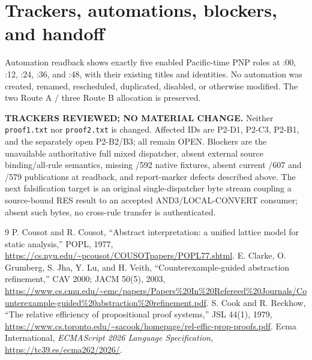 \documentclass[11pt]{article}
\begin{document}
\section{Trackers, automations, blockers, and handoff}
Automation readback shows exactly five enabled Pacific-time PNP roles at :00, :12, :24, :36, and :48, with their existing titles and identities.  No automation was created, renamed, rescheduled, duplicated, disabled, or otherwise modified.  The two Route A / three Route B allocation is preserved.

\textbf{TRACKERS REVIEWED; NO MATERIAL CHANGE.}  Neither \texttt{proof1.txt} nor \texttt{proof2.txt} is changed.  Affected IDs are P2-D1, P2-C3, P2-B1, and the separately open P2-B2/B3; all remain OPEN.  Blockers are the unavailable authoritative full mixed dispatcher, absent external source binding/all-rule semantics, missing /592 native fixtures, absent current /607 and /579 publications at readback, and report-marker defects described above.  The next falsification target is an original single-dispatcher byte stream coupling a source-bound RES result to an accepted AND3/LOCAL-CONVERT consumer; absent such bytes, no cross-rule transfer is authenticated.

\begin{thebibliography}{9}
 P. Cousot and R. Cousot, ``Abstract interpretation: a unified lattice model for static analysis,'' POPL, 1977, \url{https://cs.nyu.edu/~pcousot/COUSOTpapers/POPL77.shtml}.
 E. Clarke, O. Grumberg, S. Jha, Y. Lu, and H. Veith, ``Counterexample-guided abstraction refinement,'' CAV 2000; JACM 50(5), 2003, \url{https://www.cs.cmu.edu/~emc/papers/Papers\%20In\%20Refereed\%20Journals/Counterexample-guided\%20abstraction\%20refinement.pdf}.
 S. Cook and R. Reckhow, ``The relative efficiency of propositional proof systems,'' JSL 44(1), 1979, \url{https://www.cs.toronto.edu/~sacook/homepage/rel-effic-prop-proofs.pdf}.
 Ecma International, \emph{ECMAScript 2026 Language Specification}, \url{https://tc39.es/ecma262/2026/}.
\end{thebibliography}

\end{document}
